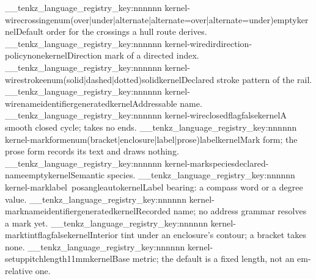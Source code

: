 \__tenkz_language_registry_key:nnnnnn {kernel-wire}{crossing}{enum(over|under|alternate|alternate=over|alternate=under)}{empty}{kernel}{Default order for the crossings a hull route derives.}
\__tenkz_language_registry_key:nnnnnn {kernel-wire}{dir}{direction-policy}{none}{kernel}{Direction mark of a directed index.}
\__tenkz_language_registry_key:nnnnnn {kernel-wire}{stroke}{enum(solid|dashed|dotted)}{solid}{kernel}{Declared stroke pattern of the rail.}
\__tenkz_language_registry_key:nnnnnn {kernel-wire}{name}{identifier}{generated}{kernel}{Addressable name.}
\__tenkz_language_registry_key:nnnnnn {kernel-wire}{closed}{flag}{false}{kernel}{A smooth closed cycle; takes no ends.}
\__tenkz_language_registry_key:nnnnnn {kernel-mark}{form}{enum(bracket|enclosure|label|prose)}{label}{kernel}{Mark form; the prose form records its text and draws nothing.}
\__tenkz_language_registry_key:nnnnnn {kernel-mark}{species}{declared-name}{empty}{kernel}{Semantic species.}
\__tenkz_language_registry_key:nnnnnn {kernel-mark}{label~pos}{angle}{auto}{kernel}{Label bearing: a compass word or a degree value.}
\__tenkz_language_registry_key:nnnnnn {kernel-mark}{name}{identifier}{generated}{kernel}{Recorded name; no address grammar resolves a mark yet.}
\__tenkz_language_registry_key:nnnnnn {kernel-mark}{tint}{flag}{false}{kernel}{Interior tint under an enclosure's contour; a bracket takes none.}
\__tenkz_language_registry_key:nnnnnn {kernel-setup}{pitch}{length}{11mm}{kernel}{Base metric; the default is a fixed length, not an em-relative one.}
